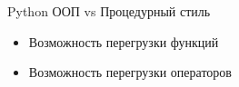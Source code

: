 \documentclass{article}
\begin{document}
\begin{center} Python ООП vs Процедурный стиль \end{center}
\begin{itemize}
    \item Возможность перегрузки функций
    \item Возможность перегрузки операторов
\end{itemize}
\newpage

\end{document}
